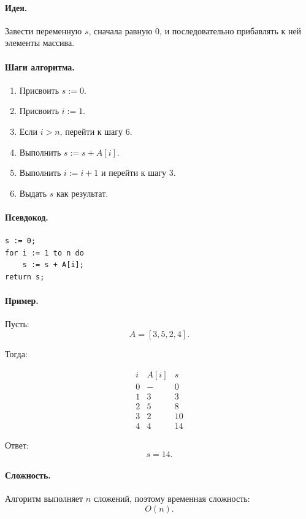 \documentclass[12pt,a4paper]{article}
\begin{document}
\paragraph{Идея.}
Завести переменную $s$, сначала равную $0$, и последовательно прибавлять к ней элементы массива.

\paragraph{Шаги алгоритма.}

\begin{enumerate}
    \item Присвоить $s := 0$.
    \item Присвоить $i := 1$.
    \item Если $i > n$, перейти к шагу 6.
    \item Выполнить $s := s + A[i]$.
    \item Выполнить $i := i + 1$ и перейти к шагу 3.
    \item Выдать $s$ как результат.
\end{enumerate}

\paragraph{Псевдокод.}

\begin{verbatim}
s := 0;
for i := 1 to n do
    s := s + A[i];
return s;
\end{verbatim}

\paragraph{Пример.}

Пусть:
\[
    A = [3, 5, 2, 4].
\]

Тогда:

\[
\begin{array}{c|c|c}
i & A[i] & s\\
\hline
0 & - & 0\\
1 & 3 & 3\\
2 & 5 & 8\\
3 & 2 & 10\\
4 & 4 & 14
\end{array}
\]

Ответ:
\[
    s = 14.
\]

\paragraph{Сложность.}
Алгоритм выполняет $n$ сложений, поэтому временная сложность:
\[
    O(n).
\]
\end{document}
